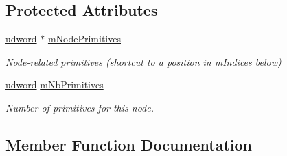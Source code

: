 \subsection*{Protected Attributes}
\begin{DoxyCompactItemize}
\item 
\hyperlink{IceTypes_8h_a44c6f1920ba5551225fb534f9d1a1733}{udword} $\ast$ \hyperlink{classOpcode_1_1AABBTreeNode_a491abd9c69cc731cee5cb9189a93e8e5}{m\+Node\+Primitives}\hypertarget{classOpcode_1_1AABBTreeNode_a491abd9c69cc731cee5cb9189a93e8e5}{}\label{classOpcode_1_1AABBTreeNode_a491abd9c69cc731cee5cb9189a93e8e5}

\begin{DoxyCompactList}\small\item\em Node-\/related primitives (shortcut to a position in m\+Indices below) \end{DoxyCompactList}\item 
\hyperlink{IceTypes_8h_a44c6f1920ba5551225fb534f9d1a1733}{udword} \hyperlink{classOpcode_1_1AABBTreeNode_ac4ab77883ac393f3421dd434ff15ec76}{m\+Nb\+Primitives}\hypertarget{classOpcode_1_1AABBTreeNode_ac4ab77883ac393f3421dd434ff15ec76}{}\label{classOpcode_1_1AABBTreeNode_ac4ab77883ac393f3421dd434ff15ec76}

\begin{DoxyCompactList}\small\item\em Number of primitives for this node. \end{DoxyCompactList}\end{DoxyCompactItemize}


\subsection{Member Function Documentation}
